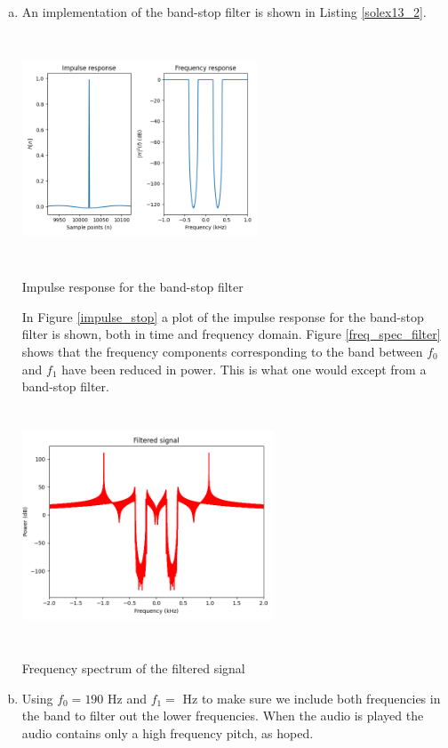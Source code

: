 \begin{enumerate}
\begin{enumerate}[a)]
\item An implementation of the band-stop filter is shown in Listing \ref{solex13_2}.


\begin{marginfigure}
\includegraphics[width=7.0cm,height=6.8cm]{ch13/figures/impulse_response.png}
\caption{Impulse response for the band-stop filter}
\label{impulse_stop}
\end{marginfigure}

In Figure \ref{impulse_stop} a plot of the impulse response for the band-stop filter is shown, both in time and frequency domain. 
Figure \ref{freq_spec_filter} shows that the frequency components corresponding to the band between $f_{0}$ and $f_{1}$ have been
reduced in power. This is what one would except from a band-stop filter.

\begin{marginfigure}
\includegraphics[width=7.5cm,height=7.0cm]{ch13/figures/freq_spec_filter.png}
\caption{Frequency spectrum of the filtered signal}
\label{freq_spec_filter}
\end{marginfigure}
    
\item Using $f_{0}=190$ Hz and $f_{1}=$ Hz to make sure we include both frequencies in the band to filter out the lower frequencies. 
When the audio is played the audio contains only a high frequency pitch, as hoped. 

\end{enumerate}
\end{enumerate}